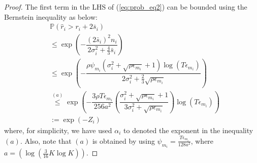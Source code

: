 \begin{proof}
The first term in the LHS of (\ref{eq:prob_eq2}) can be bounded using the Bernstein inequality as below:
\begin{align}
&\mathbb{P}\left( \hat{r}_{i} > r_{i}+ 2\bar{s}_i\right)\nonumber \\
&\le \exp\left(- \dfrac{(2\bar{s}_i)^2 n_i}{2\sigma_i^2+\frac{4}{3}\bar{s}_i}\right)\nonumber \\
& \le \exp\left(- \dfrac{\rho\psi_{m_i} (\sigma_{i}^{2}+\sqrt{\rho\epsilon_{m_{i}}} + 1)\log( T\epsilon_{m_{i}})}{2\sigma_i^2+\frac{2}{3}\sqrt{\rho \epsilon_{m_{i}}}}\right)\nonumber \\
& \overset{(a)}{\leq} \exp\left(- \dfrac{3\rho T\epsilon_{m_i}}{256 a^2} \left(\dfrac{\sigma_{i}^{2}+\sqrt{\rho\epsilon_{m_{i}}}+1}{3\sigma_{i}^{2}+\sqrt{\rho \epsilon_{m_{i}}}}\right) \log( T\epsilon_{m_{i}}) \right) \nonumber \\
&:= \exp(-Z_i) 
\label{lhs1_equn}
\end{align}
where, for simplicity, we have used $\alpha_i$ to denoted the exponent in the inequality $(a)$.
Also, note that $(a)$ is obtained by using  $\psi_{m_i}=\frac{T\epsilon_{m_i}}{128a^{2}}$, where $a=(\log(\frac{3}{16} K\log K))$.

\end{proof}

